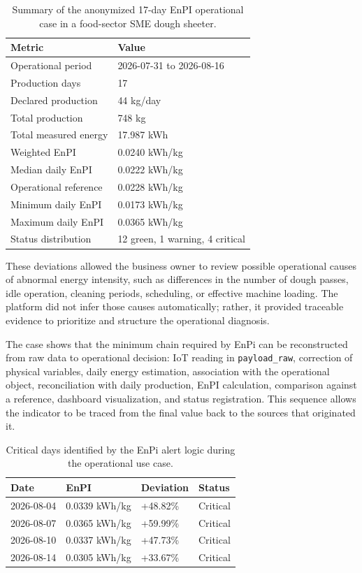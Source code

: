 \documentclass{ieeeaccess}
\begin{document}
\begin{table}[H]
\caption{Summary of the anonymized 17-day EnPI operational case in a food-sector SME dough sheeter.}
\label{tab:caso-real-summary}
\centering
\scriptsize
\begin{tabular}{p{}p{}}
\toprule
Metric & Value \\
\midrule
Operational period & 2026-07-31 to 2026-08-16 \\
Production days & 17 \\
Declared production & 44 kg/day \\
Total production & 748 kg \\
Total measured energy & 17.987 kWh \\
Weighted EnPI & 0.0240 kWh/kg \\
Median daily EnPI & 0.0222 kWh/kg \\
Operational reference & 0.0228 kWh/kg \\
Minimum daily EnPI & 0.0173 kWh/kg \\
Maximum daily EnPI & 0.0365 kWh/kg \\
Status distribution & 12 green, 1 warning, 4 critical \\
\bottomrule
\end{tabular}
\end{table}

These deviations allowed the business owner to review possible operational causes of abnormal energy intensity, such as differences in the number of dough passes, idle operation, cleaning periods, scheduling, or effective machine loading. The platform did not infer those causes automatically; rather, it provided traceable evidence to prioritize and structure the operational diagnosis. 

The case shows that the minimum chain required by EnPi can be reconstructed from raw data to operational decision: IoT reading in \texttt{payload\_raw}, correction of physical variables, daily energy estimation, association with the operational object, reconciliation with daily production, EnPI calculation, comparison against a reference, dashboard visualization, and status registration. This sequence allows the indicator to be traced from the final value back to the sources that originated it.


\begin{table}[H]
\caption{Critical days identified by the EnPi alert logic during the operational use case.}
\label{tab:critical-days}
\centering
\scriptsize
\begin{tabular}{p{}p{}p{}p{}}
\toprule
Date & EnPI & Deviation & Status \\
\midrule
2026-08-04 & 0.0339 kWh/kg & +48.82\% & Critical \\
2026-08-07 & 0.0365 kWh/kg & +59.99\% & Critical \\
2026-08-10 & 0.0337 kWh/kg & +47.73\% & Critical \\
2026-08-14 & 0.0305 kWh/kg & +33.67\% & Critical \\
\bottomrule
\end{tabular}
\end{table}
\end{document}
